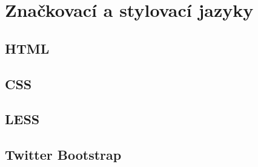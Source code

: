 \chapter{Značkovací a stylovací jazyky}
\label{chap:languages}

\section{HTML}
\label{sec:html}

\section{CSS}
\label{sec:css}

\section{LESS}
\label{sec:less}

\section{Twitter Bootstrap}
\label{sec:bootsrap}



